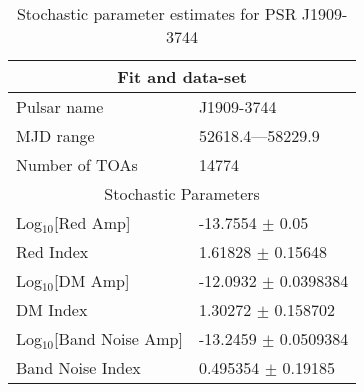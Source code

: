 \documentclass{article}
\begin{document}
\begin{table*}
\caption{Stochastic parameter estimates for PSR J1909-3744}
\begin{tabular}{ll}
\hline\hline
\multicolumn{2}{c}{Fit and data-set} \\ 
\hline
Pulsar name\dotfill & J1909-3744 \\ 
MJD range\dotfill & 52618.4---58229.9 \\ 
Number of TOAs\dotfill & 14774 \\
\hline
\multicolumn{2}{c}{Stochastic Parameters} \\ 
\hline
Log$_{10}$[Red Amp] \dotfill & -13.7554 $\pm$ 0.05  \\ 
Red Index \dotfill & 1.61828 $\pm$ 0.15648  \\ 
Log$_{10}$[DM Amp] \dotfill & -12.0932 $\pm$ 0.0398384  \\ 
DM Index \dotfill & 1.30272 $\pm$ 0.158702  \\ 
Log$_{10}$[Band Noise Amp] \dotfill & -13.2459 $\pm$ 0.0509384  \\ 
Band Noise Index \dotfill & 0.495354 $\pm$ 0.19185  \\ 
\hline
\end{tabular}
\label{Table:J1909-3744}
\end{table*} 
\end{document}
